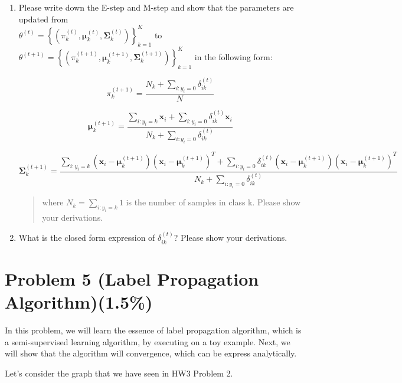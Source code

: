 \documentclass{article}
\def\vecmu{{\boldsymbol \mu}}
\begin{document}
\begin{enumerate}
\item
Please write down the E-step and M-step and show
  that the parameters are updated from \\
  \(\theta^{(t)} = \left\{ \left( \pi_{k}^{(t)},\vecmu_{k}^{(t)},\mathbf{\Sigma}_{k}^{(t)} \right) \right\}_{k = 1}^{K}\)
  to
  \(\theta^{(t + 1)} = \left\{ \left( \pi_{k}^{(t + 1)},\vecmu_{k}^{(t + 1)},\mathbf{\Sigma}_{k}^{(t + 1)} \right) \right\}_{k = 1}^{K}\)
  in the following form:


\[\pi_{k}^{(t + 1)} = \frac{N_{k} + \sum_{i:y_{i} = 0}^{}\delta_{ik}^{(t)}}{N}\]

\[\vecmu_{k}^{(t + 1)} = \frac{\sum_{i:y_{i} = k}^{}\mathbf{x}_{i} + \sum_{i:y_{i} = 0}^{}{\delta_{ik}^{(t)}\mathbf{x}_{i}}}{N_{k} + \sum_{i:y_{i} = 0}^{}\delta_{ik}^{(t)}}\]

\[\mathbf{\Sigma}_{k}^{(t + 1)} = \frac{\sum_{i:y_{i} = k}^{}{\left( \mathbf{x}_{i} - \vecmu_{k}^{(t + 1)} \right)\left( \mathbf{x}_{i} - \vecmu_{k}^{(t + 1)} \right)^{T}} + \sum_{i:y_{i} = 0}^{}{\delta_{ik}^{(t)}\left( \mathbf{x}_{i} - \vecmu_{k}^{(t + 1)} \right)\left( \mathbf{x}_{i} - \vecmu_{k}^{(t + 1)} \right)^{T}}}{N_{k} + \sum_{i:y_{i} = 0}^{}\delta_{ik}^{(t)}}\]

\begin{quote}
where \(N_{k} = \sum_{i:y_{i} = k}^{}1\) is the number of samples in
class k. Please show your derivations.
\end{quote}

\item
 What is the closed form expression of
  \(\delta_{ik}^{(t)}\)? Please show your derivations.
\end{enumerate}

\section*{Problem 5 (Label Propagation Algorithm)(1.5\%)}

In this problem, we will learn the essence of label propagation algorithm, which is a semi-supervised learning algorithm, by executing on a toy example. Next, we will show that the algorithm will convergence, which can be express analytically.

Let's consider the graph that we have seen in HW3 Problem 2.
\end{document}
